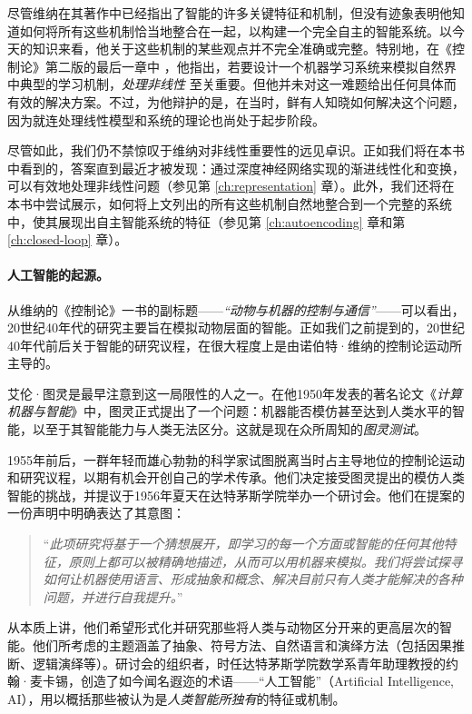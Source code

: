 \documentclass[../../book-main.tex]{subfiles}
\begin{document}
尽管维纳在其著作中已经指出了智能的许多关键特征和机制，但没有迹象表明他知道如何将所有这些机制恰当地整合在一起，以构建一个完全自主的智能系统。以今天的知识来看，他关于这些机制的某些观点并不完全准确或完整。特别地，在《控制论》第二版的最后一章中 \cite{Wiener-Cybernetics-1961}，他指出，若要设计一个机器学习系统来模拟自然界中典型的学习机制，{\em 处理非线性} 至关重要。但他并未对这一难题给出任何具体而有效的解决方案。不过，为他辩护的是，在当时，鲜有人知晓如何解决这个问题，因为就连处理线性模型和系统的理论也尚处于起步阶段。

尽管如此，我们仍不禁惊叹于维纳对非线性重要性的远见卓识。正如我们将在本书中看到的，答案直到最近才被发现：通过深度神经网络实现的渐进线性化和变换，可以有效地处理非线性问题（参见第 \ref{ch:representation} 章）。此外，我们还将在本书中尝试展示，如何将上文列出的所有这些机制自然地整合到一个完整的系统中，使其展现出自主智能系统的特征（参见第 \ref{ch:autoencoding} 章和第 \ref{ch:closed-loop} 章）。

\paragraph{人工智能的起源。}
从维纳的《控制论》一书的副标题——{\em “动物与机器的控制与通信”}——可以看出，20世纪40年代的研究主要旨在模拟动物层面的智能。正如我们之前提到的，20世纪40年代前后关于智能的研究议程，在很大程度上是由诺伯特·维纳的控制论运动所主导的。

艾伦·图灵是最早注意到这一局限性的人之一。在他1950年发表的著名论文《{\em 计算机器与智能}》\cite{Turing-1950}中，图灵正式提出了一个问题：机器能否模仿甚至达到人类水平的智能，以至于其智能能力与人类无法区分。这就是现在众所周知的{\em 图灵测试}。

1955年前后，一群年轻而雄心勃勃的科学家试图脱离当时占主导地位的控制论运动和研究议程，以期有机会开创自己的学术传承。他们决定接受图灵提出的模仿人类智能的挑战，并提议于1956年夏天在达特茅斯学院举办一个研讨会。他们在提案的一份声明中明确表达了其意图：
\begin{quote}
    ``{\em 此项研究将基于一个猜想展开，即学习的每一个方面或智能的任何其他特征，原则上都可以被精确地描述，从而可以用机器来模拟。我们将尝试探寻如何让机器使用语言、形成抽象和概念、解决目前只有人类才能解决的各种问题，并进行自我提升。}''
\end{quote}
从本质上讲，他们希望形式化并研究那些将人类与动物区分开来的更高层次的智能。他们所考虑的主题涵盖了抽象、符号方法、自然语言和演绎方法（包括因果推断、逻辑演绎等）。研讨会的组织者，时任达特茅斯学院数学系青年助理教授的约翰·麦卡锡，创造了如今闻名遐迩的术语——“人工智能”（Artificial Intelligence, AI），用以概括那些被认为是{\em 人类智能所独有}的特征或机制。
\end{document}
